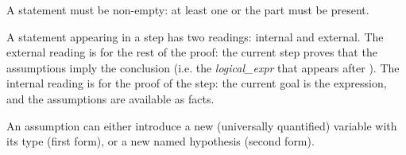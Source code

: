 \begin{syn}
 \is
     \brepet {}  \token{,} \erepet
     \boption {}  \eoption
\end{syn}

A statement must be non-empty: at least one  or the
 part must be present.

A statement appearing in a step has two readings: internal and
external.  The external reading is for the rest of the
proof: the current step proves that the assumptions imply the
conclusion (i.e. the {\em logical\_expr} that appears after
).  The internal reading is for the proof of the step:
the current goal is the  expression, and the
assumptions are available as facts.

\begin{syn}
 \is
       
\alt {} \token{:} 
\end{syn}


An assumption can either introduce a new (universally quantified)
variable with its type (first form), or a new named hypothesis (second
form).

\begin{syn}
 \is
           \boption \boption {} \eoption \token{\#} \eoption
        \brepet \token{,}
           \boption \boption {} \eoption \token{\#} \eoption
        \erepet
\alt {}
        \brepet \token{,}
        \erepet
\alt \bparen {} \mid {} \eparen
           \boption \boption \boption \boption {}
           \eoption \token{\#} \eoption {} \eoption
           \token{!} \eoption {}
        \brepet \token{,}
           \boption \boption \boption \boption {}
           \eoption \token{\#} \eoption {} \eoption
           \token{!} \eoption {}
        \erepet
\alt \bparen {} \mid {} \eparen
        \brepetsep
           \boption \boption \boption \boption {}
           \eoption \token{\#} \eoption {} \eoption
           \token{!} \eoption {}
        \erepetsep{\token{,}}
\alt {}
        \brepet \token{,}
        \erepet
\end{syn}

